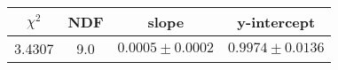 \begin{tabular}{|c|c|c|c|}

\hline
$\chi^{2}$ & NDF & slope & y-intercept  \\
\hline
3.4307 & 9.0 & $0.0005\pm0.0002$ & $0.9974\pm0.0136$ \\
\hline

\end{tabular}